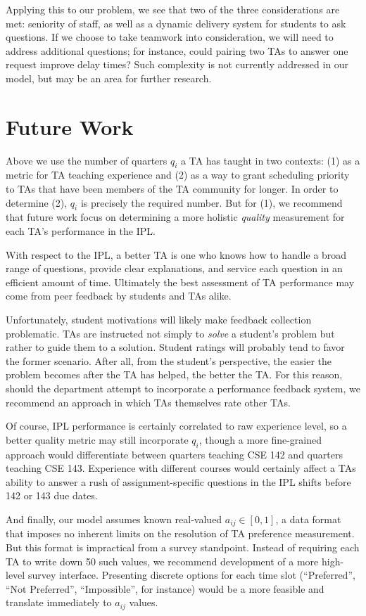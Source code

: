 \documentclass{article}
\begin{document}
\begin{multicols}{2}
Applying this to our problem, we see that two of the three considerations are met: seniority of staff, as well as a dynamic delivery system for students to ask questions. If we choose to take teamwork into consideration, we will need to address additional questions; for instance, could pairing two TAs to answer one request improve delay times? Such complexity is not currently addressed in our model, but may be an area for further research.

\section*{Future Work}

Above we use the number of quarters $q_i$ a TA has taught in two contexts: (1) as a metric for TA teaching experience and (2) as a way to grant scheduling priority to TAs that have been members of the TA community for longer. In order to determine (2), $q_i$ is precisely the required number. But for (1), we recommend that future work focus on determining a more holistic \textit{quality} measurement for each TA's performance in the IPL.

With respect to the IPL, a better TA is one who knows how to handle a broad range of questions, provide clear explanations, and service each question in an efficient amount of time. Ultimately the best assessment of TA performance may come from peer feedback by students and TAs alike.

Unfortunately, student motivations will likely make feedback collection problematic. TAs are instructed not simply to \textit{solve} a student's problem but rather to guide them to a solution. Student ratings will probably tend to favor the former scenario. After all, from the student's perspective, the easier the problem becomes after the TA has helped, the better the TA. For this reason, should the department attempt to incorporate a performance feedback system, we recommend an approach in which TAs themselves rate other TAs.

Of course, IPL performance is certainly correlated to raw experience level, so a better quality metric may still incorporate $q_i$, though a more fine-grained approach would differentiate between quarters teaching CSE 142 and quarters teaching CSE 143. Experience with different courses would certainly affect a TAs ability to answer a rush of assignment-specific questions in the IPL shifts before 142 or 143 due dates.

And finally, our model assumes known real-valued $a_{ij} \in [0,1]$, a data format that imposes no inherent limits on the resolution of TA preference measurement. But this format is impractical from a survey standpoint. Instead of requiring each TA to write down 50 such values, we recommend development of a more high-level survey interface. Presenting discrete options for each time slot (``Preferred'', ``Not Preferred'', ``Impossible'', for instance) would be a more feasible and translate immediately to $a_{ij}$ values.


\end{multicols}
\end{document}
